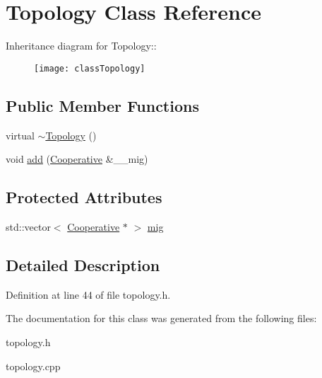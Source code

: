 \hypertarget{classTopology}{
\section{Topology Class Reference}
\label{classTopology}
}
Inheritance diagram for Topology::\begin{figure}[H]
\begin{center}
\leavevmode
\texttt{[image: classTopology]}
\end{center}
\end{figure}
\subsection*{Public Member Functions}
\begin{CompactItemize}
\item 
\hypertarget{classTopology_3e447669757c8311c7f6f8edc705abf2}{
virtual \hyperlink{classTopology_3e447669757c8311c7f6f8edc705abf2}{$\sim$Topology} ()}
\label{classTopology_3e447669757c8311c7f6f8edc705abf2}

\item 
\hypertarget{classTopology_62bc46d8c20fdc71dad9e7c7a0d7aded}{
void \hyperlink{classTopology_62bc46d8c20fdc71dad9e7c7a0d7aded}{add} (\hyperlink{classCooperative}{Cooperative} \&\_\-\_\-mig)}
\label{classTopology_62bc46d8c20fdc71dad9e7c7a0d7aded}

\end{CompactItemize}
\subsection*{Protected Attributes}
\begin{CompactItemize}
\item 
\hypertarget{classTopology_247a2faa8568b678f0b7b11e62c7812c}{
std::vector$<$ \hyperlink{classCooperative}{Cooperative} $\ast$ $>$ \hyperlink{classTopology_247a2faa8568b678f0b7b11e62c7812c}{mig}}
\label{classTopology_247a2faa8568b678f0b7b11e62c7812c}

\end{CompactItemize}


\subsection{Detailed Description}




Definition at line 44 of file topology.h.

The documentation for this class was generated from the following files:\begin{CompactItemize}
\item 
topology.h\item 
topology.cpp\end{CompactItemize}
